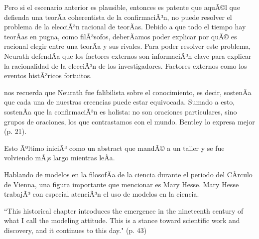 Pero si el escenario anterior es plausible, entonces es patente que aquÃ©l que defienda una teorÃ­a coherentista de la confirmaciÃ³n, no puede resolver el problema de la elecciÃ³n racional de teorÃ­as.
Debido a que todo el tiempo hay teorÃ­as en pugna, como filÃ³sofos, deberÃ­amos poder explicar por quÃ© es racional elegir entre una teorÃ­a y sus rivales. Para poder resolver este problema, Neurath defendÃ­a que los factores externos son informaciÃ³n clave para explicar la racionalidad de la elecciÃ³n de los investigadores.
Factores externos como los eventos histÃ³ricos fortuitos.

\textcite{Bentley2023} nos recuerda que Neurath fue falibilista sobre el conocimiento, es decir,  sostenÃ­a que cada una de nuestras creencias puede estar equivocada.
Sumado a esto, sostenÃ­a que la confirmaciÃ³n es holista: no son oraciones particulares, sino grupos de oraciones, los que contrastamos con el mundo.
Bentley lo expresa mejor  (p. 21).



Esto Ãºltimo iniciÃ³ como un abstract que mandÃ© a un taller y se fue volviendo mÃ¡s largo mientras leÃ­a.

Hablando de modelos en la filosofÃ­a de la ciencia durante el periodo del CÃ­rculo de Vienna, una figura importante que mencionar es Mary Hesse.
Mary Hesse trabajÃ³ con especial atenciÃ³n el uso de modelos en la ciencia.

``This historical chapter introduces the emergence in the nineteenth century of  what I call the modeling attitude.
This is a stance toward scientific work and  discovery, and it continues to this day." (p. 43)





